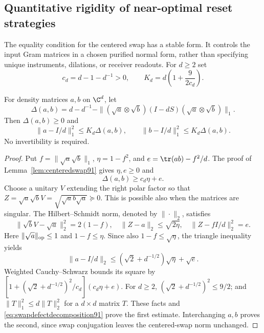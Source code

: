 
\subsection{Quantitative rigidity of near-optimal reset strategies}
The equality condition for the centered swap has a stable form.  It
controls the input Gram matrices in a chosen purified normal form,
rather than specifying unique instruments, dilations, or receiver
readouts.  For $d\ge2$ set
\[
 c_d=d-1-d^{-1}>0,\qquad
 K_d=d\left(1+\frac{9}{2c_d}\right).
\]
\begin{lemma}\label{lem:stableswap91}
For density matrices $a,b$ on $\C^d$, let
\[
 \Delta(a,b)=d-d^{-1}
  -\| (\sqrt a\otimes\sqrt b)(I-dS)
                         (\sqrt a\otimes\sqrt b)\|_1.
\]
Then $\Delta(a,b)\ge0$ and
\begin{equation}\label{eq:stableswap91}
 \|a-I/d\|_1^2\le K_d\Delta(a,b),\qquad
 \|b-I/d\|_1^2\le K_d\Delta(a,b).
\end{equation}
No invertibility is required.
\end{lemma}
\begin{proof}
Put $f=\|\sqrt a\sqrt b\|_1$, $\eta=1-f^2$, and
$e=\tr(ab)-f^2/d$.  The proof of Lemma~\ref{lem:centeredswap91}
gives $\eta,e\ge0$ and
\begin{equation}\label{eq:swapdefectdecomposition91}
 \Delta(a,b)\ge c_d\eta+e.
\end{equation}
Choose a unitary $V$ extending the right polar factor so that
$Z=\sqrt a\sqrt b V=\sqrt{\sqrt a b\sqrt a}\succeq0$.
This is possible also when the matrices are singular.  The
Hilbert--Schmidt norm, denoted by $\|\cdot\|_2$, satisfies
\[
 \|\sqrt b V-\sqrt a\|_2^2=2(1-f),\quad
 \|Z-a\|_2\le\sqrt{2\eta},\quad
 \|Z-fI/d\|_2^2=e.
\]
Here $\|\sqrt a\|_{\rm op}\le1$ and $1-f\le\eta$.
Since also $1-f\le\sqrt\eta$, the triangle inequality yields
\[
 \|a-I/d\|_2\le(\sqrt2+d^{-1/2})\sqrt\eta+\sqrt e.
\]
Weighted Cauchy--Schwarz bounds its square by
$[1+(\sqrt2+d^{-1/2})^2/c_d](c_d\eta+e)$.
For $d\ge2$, $(\sqrt2+d^{-1/2})^2\le9/2$; and
$\|T\|_1^2\le d\|T\|_2^2$ for a $d\times d$ matrix $T$.
These facts and \eqref{eq:swapdefectdecomposition91} prove the first
estimate.  Interchanging $a,b$ proves the second, since swap
conjugation leaves the centered-swap norm unchanged.
\end{proof}

